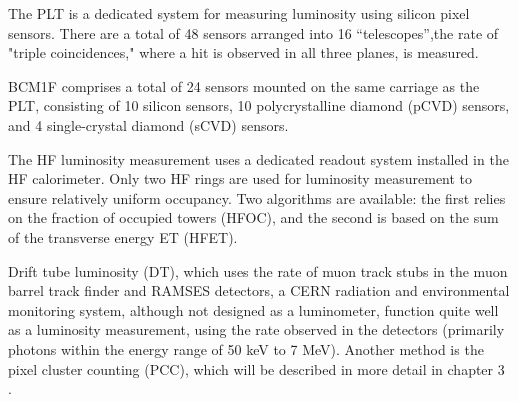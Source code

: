 The PLT is a dedicated system for measuring luminosity using silicon pixel sensors. There are a total of 48 sensors arranged into 16 “telescopes”,the rate of "triple coincidences," where a hit is observed in all three planes, is measured.

BCM1F comprises a total of 24 sensors mounted on the same carriage as the PLT, consisting of 10 silicon sensors, 10 polycrystalline diamond (pCVD) sensors, and 4 single-crystal diamond (sCVD) sensors.

The HF luminosity measurement uses a dedicated readout system installed in the HF calorimeter. Only two HF rings are used for luminosity measurement to ensure relatively uniform occupancy. Two algorithms are available: the first relies on the fraction of occupied towers (HFOC), and the second is based on the sum of the transverse energy ET (HFET).

Drift tube luminosity (DT), which uses the rate of muon track stubs in the muon barrel track finder and  RAMSES detectors, a CERN radiation and environmental monitoring system, although not designed as a luminometer, function quite well as a luminosity measurement, using the rate observed in the detectors (primarily photons within the energy range of 50 keV to 7 MeV). Another method is the pixel cluster counting (PCC), which will be described in more detail in chapter 3 \cite{pas_18}.